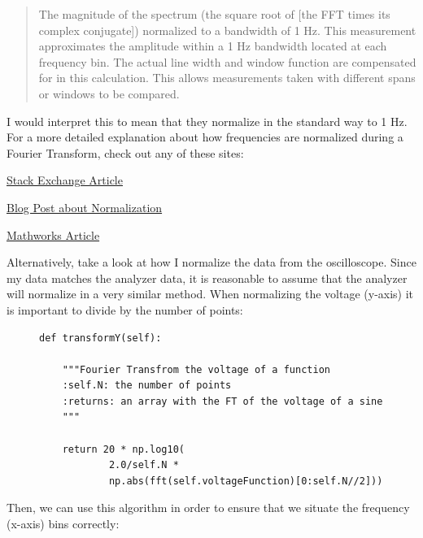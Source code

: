 \documentclass{article}
\begin{document}
\begin{quote}
The magnitude of the spectrum (the square root of [the FFT times its
complex conjugate]) normalized to a bandwidth of 1 Hz. This measurement
approximates the amplitude within a 1 Hz bandwidth located at each
frequency bin. The actual line width and window function are compensated for
in this calculation. This allows measurements taken with different spans or
windows to be compared.
\end{quote}

I would interpret this to mean that they normalize in the standard way to 1 Hz.
For a more detailed explanation about how frequencies are normalized during a
Fourier Transform, check out any of these sites:

\href{dsp.stackexchange.com/questions/41518/what-is-normalized-frequency}{Stack Exchange Article}

\href{matteolandi.blogspot.com/2010/08/notes-about-fft-normalization.html}{Blog Post about Normalization} 

\href{www.mathworks.com/matlabcentral/answers/15770-scaling-the-fft-and-the-ifft}{Mathworks Article} 

Alternatively, take a look at how I normalize the data from the oscilloscope.
Since my data matches the analyzer data, it is reasonable to assume that the
analyzer will normalize in a very similar method. When normalizing the voltage
(y-axis) it is important to divide by the number of points:

\begin{figure}[H]
\centering
\begin{minipage}{1\textwidth}
\begin{tcolorbox}
\begin{verbatim}
def transformY(self):

    """Fourier Transfrom the voltage of a function
    :self.N: the number of points
    :returns: an array with the FT of the voltage of a sine
    """

    return 20 * np.log10(
            2.0/self.N *
            np.abs(fft(self.voltageFunction)[0:self.N//2]))
\end{verbatim}
\end{tcolorbox}
\end{minipage}
\end{figure}

Then, we can use this algorithm in order to ensure that we situate the
frequency (x-axis) bins correctly: 
\end{document}
